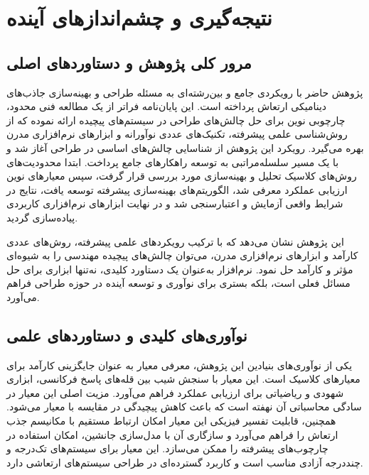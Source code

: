 \chapter{نتیجه‌گیری و چشم‌اندازهای آینده}

\section{مرور کلی پژوهش و دستاوردهای اصلی}

پژوهش حاضر با رویکردی جامع و بین‌رشته‌ای به مسئله طراحی و بهینه‌سازی جاذب‌های دینامیکی ارتعاش پرداخته است. این پایان‌نامه فراتر از یک مطالعه فنی محدود، چارچوبی نوین برای حل چالش‌های طراحی  در سیستم‌های پیچیده ارائه نموده که از روش‌شناسی علمی پیشرفته، تکنیک‌های عددی نوآورانه و ابزارهای نرم‌افزاری مدرن بهره می‌گیرد. رویکرد این پژوهش از شناسایی چالش‌های اساسی در طراحی  آغاز شد و با یک مسیر سلسله‌مراتبی به توسعه راهکارهای جامع پرداخت. ابتدا محدودیت‌های روش‌های کلاسیک تحلیل و بهینه‌سازی مورد بررسی قرار گرفت، سپس معیارهای نوین ارزیابی عملکرد معرفی شد، الگوریتم‌های بهینه‌سازی پیشرفته توسعه یافت، نتایج در شرایط واقعی آزمایش و اعتبارسنجی شد و در نهایت ابزارهای نرم‌افزاری کاربردی پیاده‌سازی گردید.

این پژوهش نشان می‌دهد که با ترکیب رویکردهای علمی پیشرفته، روش‌های عددی کارآمد و ابزارهای نرم‌افزاری مدرن، می‌توان چالش‌های پیچیده مهندسی را به شیوه‌ای مؤثر و کارآمد حل نمود. نرم‌افزار  به‌عنوان یک دستاورد کلیدی، نه‌تنها ابزاری برای حل مسائل فعلی است، بلکه بستری برای نوآوری و توسعه آینده در حوزه طراحی  فراهم می‌آورد.

\section{نوآوری‌های کلیدی و دستاوردهای علمی}

یکی از نوآوری‌های بنیادین این پژوهش، معرفی معیار  به عنوان جایگزینی کارآمد برای معیارهای کلاسیک است. این معیار با سنجش شیب بین قله‌های پاسخ فرکانسی، ابزاری شهودی و ریاضیاتی برای ارزیابی عملکرد  فراهم می‌آورد. مزیت اصلی این معیار در سادگی محاسباتی آن نهفته است که باعث کاهش پیچیدگی در مقایسه با معیار  می‌شود. همچنین، قابلیت تفسیر فیزیکی این معیار امکان ارتباط مستقیم با مکانیسم جذب ارتعاش را فراهم می‌آورد و سازگاری آن با مدل‌سازی جانشین، امکان استفاده در چارچوب‌های پیشرفته را ممکن می‌سازد. این معیار برای سیستم‌های تک‌درجه و چنددرجه آزادی مناسب است و کاربرد گسترده‌ای در طراحی سیستم‌های ارتعاشی دارد.

